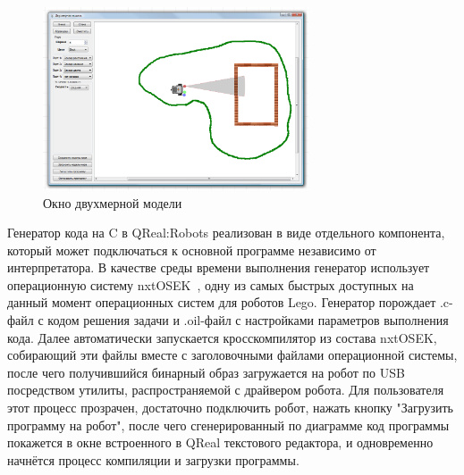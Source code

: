 \documentclass[a4paper]{article}
\begin{document}
\begin{figure} [ht]
  \begin{center}
    \includegraphics[width=0.7\textwidth]{2dModel.png}
    \caption{Окно двухмерной модели}
    \label{2dModel}
  \end{center}
\end{figure}

Генератор кода на C в QReal:Robots реализован в виде отдельного компонента, который может подключаться к основной программе независимо от интерпретатора. В качестве среды времени выполнения генератор использует операционную систему nxtOSEK~\cite{nxtOsek}, одну из самых быстрых доступных на данный момент операционных систем для роботов Lego. Генератор порождает .c-файл с кодом решения задачи и .oil-файл с настройками параметров выполнения кода. Далее автоматически запускается кросскомпилятор из состава nxtOSEK, собирающий эти файлы вместе с заголовочными файлами операционной системы, после чего получившийся бинарный образ загружается на робот по USB посредством утилиты, распространяемой с драйвером робота. Для пользователя этот процесс прозрачен, достаточно подключить робот, нажать кнопку "Загрузить программу на робот", после чего сгенерированный по диаграмме код программы покажется в окне встроенного в QReal текстового редактора, и одновременно начнётся процесс компиляции и загрузки программы.
\end{document}
